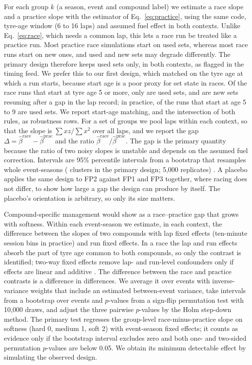 For each group $k$ (a season, event and compound label) we estimate a race slope and a practice slope with the estimator of Eq.~\eqref{eq:practice}, using the same code, tyre-age window (6 to 16 laps) and assumed fuel effect in both contexts.
Unlike Eq.~\eqref{eq:race}, which needs a common lap, this lets a race run be treated like a practice run.
Most practice race simulations start on used sets, whereas most race runs start on new ones, and used and new sets may degrade differently.
The primary design therefore keeps used sets only, in both contexts, as flagged in the timing feed.
We prefer this to our first design, which matched on the tyre age at which a run starts, because start age is a poor proxy for set state in races.
Of the \RaceRunsStartAge{} race runs that start at tyre age 5 or more, only \RaceRunsStartAgeUsed{} are used sets, and \RaceRunsStartAgeGap{} are new sets resuming after a gap in the lap record; in practice, \PracRunsStartAgeUsed{} of the \PracRunsStartAge{} runs that start at age 5 to 9 are used sets.
We report start-age matching, and the intersection of both rules, as robustness rows.
For a set of groups we pool laps within each context, so that the slope is $\sum xz/\sum x^2$ over all laps, and we report the gap $\Delta=\hat\beta^{\mathrm{race}}-\hat\beta^{\mathrm{prac}}$ and the ratio $\hat\beta^{\mathrm{race}}/\hat\beta^{\mathrm{prac}}$.
The gap is the primary quantity because the ratio of two noisy slopes is unstable and depends on the assumed fuel correction.
Intervals are 95\% percentile intervals from a bootstrap that resamples whole event-seasons (\NMatchedEventSeasons{} clusters in the primary design; 5,000 replicates) \citep{cameron2008bootstrap}.
A placebo applies the same design to FP2 against FP1 and FP3 together, where racing does not differ, to show how large a gap the design can produce by itself.
The placebo's orientation is arbitrary, so only its size matters.

Compound-specific management would show as a race--practice gap that grows with softness.
Within each event-season we estimate, in each context, the difference between the slopes of two compounds with lap fixed effects (ten-minute session bins in practice) and run fixed effects.
In a race the lap and run effects absorb the part of tyre age common to both compounds, so only the contrast is identified; two-way fixed effects remove lap- and run-level confounders only if effects are linear and additive \citep{imai2021twfe}.
The difference between the race and practice contrasts is a difference in differences.
We average it over events with inverse-variance weights that include an estimated between-event variance, take intervals from a bootstrap over events and $p$-values from a sign-flip permutation test with 10,000 draws, and adjust the three pairwise $p$-values by the Holm step-down method.
The primary test regresses the group-level race-minus-practice slope on softness (hard 0, medium 1, soft 2) with event-season fixed effects; it counts as evidence only if the bootstrap interval excludes zero and both one- and two-sided permutation $p$-values are below 0.05.
We obtain its minimum detectable effect by simulating the observed design.

